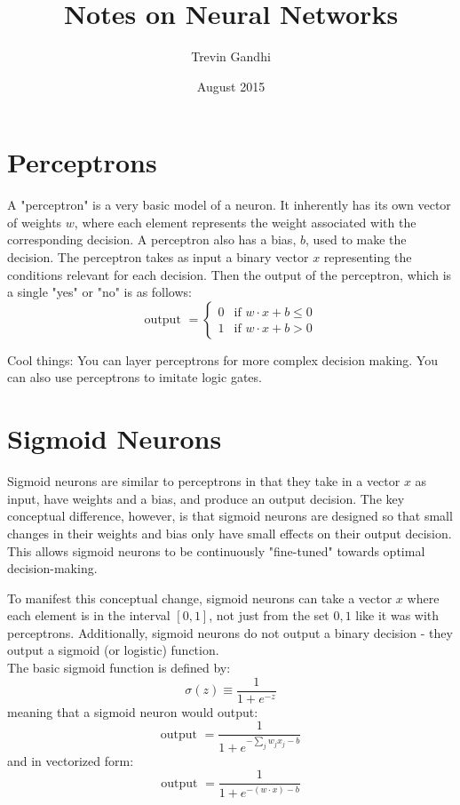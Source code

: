 \documentclass{article}
\title{Notes on Neural Networks}
\author{Trevin Gandhi}
\date{August 2015}
\begin{document}
\maketitle

\section{Perceptrons}
A "perceptron" is a very basic model of a neuron. It inherently has its own vector of weights $w$, where each element represents the weight associated with the corresponding decision.  A perceptron also has a bias, $b$, used to make the decision. The perceptron takes as input a binary vector $x$ representing the conditions relevant for each decision. Then the output of the perceptron, which is a single "yes" or "no" is as follows:
\begin{equation}
\text{output } = \begin{cases} 0 &\mbox{if } w \cdot x + b \leq 0 \\
				          1 &\mbox{if } w \cdot x + b > 0 \end{cases}
\end{equation}

Cool things: You can layer perceptrons for more complex decision making. You can also use perceptrons to imitate logic gates.

\section{Sigmoid Neurons}
Sigmoid neurons are similar to perceptrons in that they take in a vector $x$ as input, have weights and a bias, and produce an output decision. The key conceptual difference, however, is that sigmoid neurons are designed so that small changes in their weights and bias only have small effects on their output decision. This allows sigmoid neurons to be continuously "fine-tuned" towards optimal decision-making. 

To manifest this conceptual change, sigmoid neurons can take a vector $x$ where each element is in the interval $[0, 1]$, not just from the set ${0, 1}$ like it was with perceptrons. Additionally, sigmoid neurons do not output a binary decision - they output a sigmoid (or logistic) function. \\
The basic sigmoid function is defined by:
\begin{equation}
\sigma (z) \equiv \frac{1}{1 + e^{-z}}
\end{equation}
meaning that a sigmoid neuron would output:
\begin{equation}
\text{output } = \frac{1}{1 + e^{-\sum_{j}w_j x_j - b}}
\end{equation}
and in vectorized form:
\begin{equation}
\text{output } = \frac{1}{1 + e^{- (w \cdot x) - b}}
\end{equation}
\end{document}
